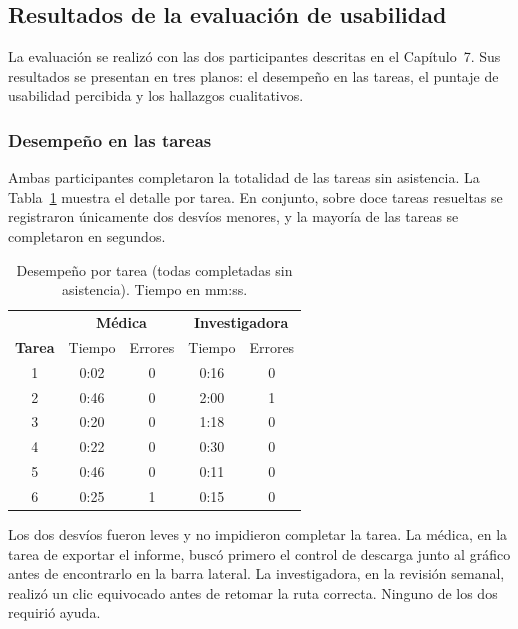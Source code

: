 \documentclass[12pt,a4paper]{article}
\begin{document}
    \subsection{Resultados de la evaluación de usabilidad}
    La evaluación se realizó con las dos participantes descritas en el Capítulo~7. Sus resultados se presentan en tres planos: el desempeño en las tareas, el puntaje de usabilidad percibida y los hallazgos cualitativos.

    \subsubsection{Desempeño en las tareas}
    Ambas participantes completaron la totalidad de las tareas sin asistencia. La Tabla~\ref{tab:desempeno} muestra el detalle por tarea. En conjunto, sobre doce tareas resueltas se registraron únicamente dos desvíos menores, y la mayoría de las tareas se completaron en segundos.

    \begin{table}[h]
        \centering
        \begin{tabular}{c c c c c}
            \hline
            & \multicolumn{2}{c}{\textbf{Médica}} & \multicolumn{2}{c}{\textbf{Investigadora}} \\
            \textbf{Tarea} & Tiempo & Errores & Tiempo & Errores \\
            \hline
            1 & 0:02 & 0 & 0:16 & 0 \\
            2 & 0:46 & 0 & 2:00 & 1 \\
            3 & 0:20 & 0 & 1:18 & 0 \\
            4 & 0:22 & 0 & 0:30 & 0 \\
            5 & 0:46 & 0 & 0:11 & 0 \\
            6 & 0:25 & 1 & 0:15 & 0 \\
            \hline
        \end{tabular}
        \caption{Desempeño por tarea (todas completadas sin asistencia). Tiempo en mm:ss.}
        \label{tab:desempeno}
    \end{table}

    Los dos desvíos fueron leves y no impidieron completar la tarea. La médica, en la tarea de exportar el informe, buscó primero el control de descarga junto al gráfico antes de encontrarlo en la barra lateral. La investigadora, en la revisión semanal, realizó un clic equivocado antes de retomar la ruta correcta. Ninguno de los dos requirió ayuda.
\end{document}

